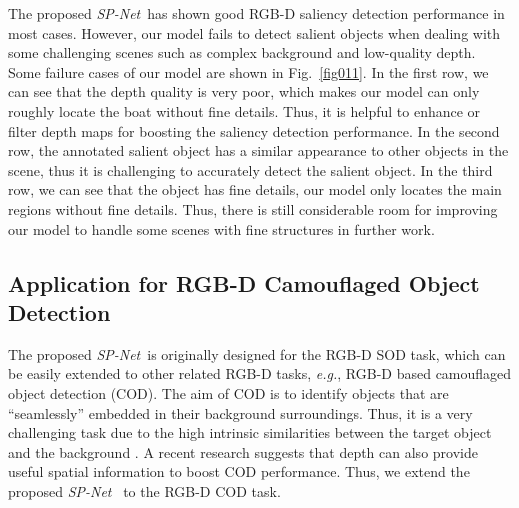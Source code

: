 \documentclass[10pt,twocolumn,letterpaper]{article}
\def\eg{\emph{e.g.}}
\def\ours{\emph{SP-Net}}
\begin{document}
The proposed \ours~has shown good RGB-D saliency detection performance in most cases. However, our model fails to detect salient objects when dealing with some challenging scenes such as complex background and low-quality depth. Some failure cases of our model are shown in Fig.~\ref{fig011}. In the first row, we can see that the depth quality is very poor, which makes our model can only roughly locate the boat without fine details. Thus, it is helpful to enhance or filter depth maps for boosting the saliency detection performance. In the second row, the annotated salient object has a similar appearance to other objects in the scene, thus it is challenging to accurately detect the salient object. In the third row, we can see that the object has fine details, our model only locates the main regions without fine details. Thus, there is still considerable room for improving our model to handle some scenes with fine structures in further work.


\subsection{Application for RGB-D Camouflaged Object Detection}
\label{COD_enten}

The proposed \ours~is originally designed for the RGB-D SOD task, which can be easily extended to other related RGB-D tasks, \eg, RGB-D based camouflaged object detection (COD). The aim of COD is to identify objects that are ``seamlessly” embedded in their background surroundings. Thus, it is a very challenging task due to the high intrinsic similarities between the target object and the background \cite{fan2021concealed,sun2021context,lim2021}. A recent research \cite{zhang2021depth} suggests that depth can also provide useful spatial information to boost COD performance. Thus, we extend the proposed \ours~ to the RGB-D COD task.
\end{document}
